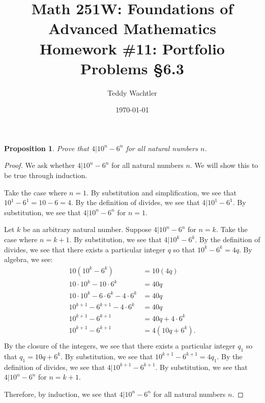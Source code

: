 \documentclass{amsart}
\newtheorem*{proposition}{Proposition}
\numberwithin{equation}{section}
\begin{document}
	\title[Math 251W: Homework \#11]{
		Math 251W: Foundations of Advanced Mathematics \\
		\textmd{Homework \#11: Portfolio Problems \S 6.3}}
	\author{Teddy Wachtler}
	\date{\today}

	\maketitle


	\begin{problem}[manual-num=58]
		\begin{proposition}
			Prove that $4 | 10^n - 6^n$ for all natural numbers $n$.
		\end{proposition}

		\begin{proof}
			We ask whether $4 | 10^n - 6^n$ for all natural numbers $n$.
			We will show this to be true through induction.

			Take the case where $n = 1$.
			By substitution and simplification, we see that $10^{1} - 6^{1} = 10 - 6 = 4$.
			By the definition of divides, we see that $4 | 10^1 - 6^1$.
			By substitution, we see that $4 | 10^n - 6^n$ for $n = 1$.

			Let $k$ be an arbitrary natural number. Suppose $4 | 10^n - 6^n$ for $n = k$.
			Take the case where $n = k + 1$.
			By substitution, we see that $4 | 10^{k} - 6^{k}$.
			By the definition of divides, we see that there exists a particular integer $q$ so that $10^k - 6^k = 4q$.
			By algebra, we see:
			\begin{align*}
				10(10^k - 6^k) &= 10(4q) \\
				10 \cdot 10^k - 10 \cdot 6^k &= 40q \\
				10 \cdot 10^k - 6 \cdot 6^k - 4 \cdot 6^k &= 40q \\
				10^{k + 1} - 6^{k + 1} - 4 \cdot 6^k &= 40q \\
				10^{k + 1} - 6^{k + 1} &= 40q + 4 \cdot 6^k \\
				10^{k + 1} - 6^{k + 1} &= 4(10q + 6^k). \\
			\end{align*}
			By the closure of the integers, we see that there exists a particular integer $q_1$ so that $q_1 = 10q + 6^k$.
			By substitution, we see that $10^{k + 1} - 6^{k + 1} = 4q_1$.
			By the definition of divides, we see that $4 | 10^{k + 1} - 6^{k + 1}$.
			By substitution, we see that $4 | 10^n - 6^n$ for $n = k + 1$.

			Therefore, by induction, we see that $4 | 10^n - 6^n$ for all natural numbers $n$.

		\end{proof}
	\end{problem}
\end{document}

